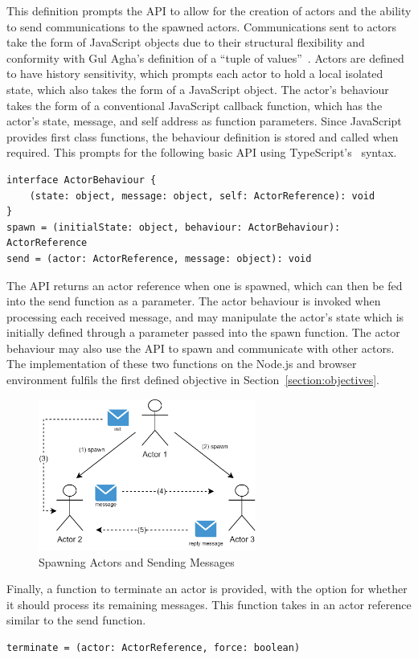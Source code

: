 \documentclass[oneside]{um-fict}
\begin{document}
This definition prompts the API to allow for the creation of actors and the ability to send communications to the spawned actors. Communications sent to actors take the form of JavaScript objects due to their structural flexibility and conformity with Gul Agha's definition of a “tuple of values”~\cite{agha1985actors}. Actors are defined to have history sensitivity, which prompts each actor to hold a local isolated state, which also takes the form of a JavaScript object. The actor's behaviour takes the form of a conventional JavaScript callback function, which has the actor's state, message, and self address as function parameters. Since JavaScript provides first class functions, the behaviour definition is stored and called when required. This prompts for the following basic API using TypeScript's~\cite{typescript} syntax.
\begin{lstlisting}
interface ActorBehaviour {
    (state: object, message: object, self: ActorReference): void
}
spawn = (initialState: object, behaviour: ActorBehaviour): ActorReference
send = (actor: ActorReference, message: object): void    
\end{lstlisting}
The API returns an actor reference when one is spawned, which can then be fed into the send function as a parameter. The actor behaviour is invoked when processing each received message, and may manipulate the actor's state which is initially defined through a parameter passed into the spawn function. The actor behaviour may also use the API to spawn and communicate with other actors. The implementation of these two functions on the Node.js and browser environment fulfils the first defined objective in Section~\ref{section:objectives}. 
\begin{figure}[H]
    \begin{centering}
        \includegraphics[width=270px]{resources/actors.png}
        \caption{Spawning Actors and Sending Messages}\label{fig:actors}
    \end{centering}
\end{figure}
Finally, a function to terminate an actor is provided, with the option for whether it should process its remaining messages. This function takes in an actor reference similar to the send function.
\begin{lstlisting}
terminate = (actor: ActorReference, force: boolean)
\end{lstlisting}
\end{document}

